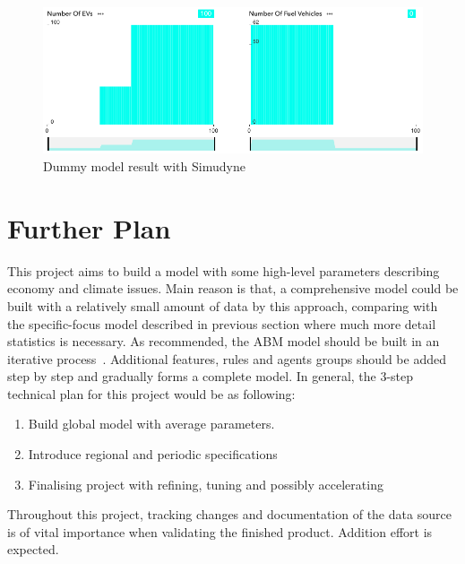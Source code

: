 \documentclass[12pt,twoside]{report}
\begin{document}
	\begin{figure}[h]
		\centering
		\includegraphics[width = 1\linewidth]{./figures/dummy}
		\caption{Dummy model result with Simudyne}
		\label{fig:dummy}
	\end{figure}


	
	
	\chapter{Further Plan}\label{ch:further-plan}
	This project aims to build a model with some high-level parameters describing economy and climate issues.
	Main reason is that, a comprehensive model could be built with a relatively small amount of data by this
	approach, comparing with the specific-focus model described in previous section where much more detail statistics
	is necessary.
	As recommended, the ABM model should be built in an iterative process~\cite{macal2014introductory}.
	Additional features, rules and agents groups should be added step by step and gradually forms a complete model.
	In general, the 3-step technical plan for this project would be as following:
	\begin{enumerate}
		\item Build global model with average parameters.
		\item Introduce regional and periodic specifications
		\item Finalising project with refining, tuning and possibly accelerating
	\end{enumerate}
	Throughout this project, tracking changes and documentation of the data source is of vital importance when
	validating the finished product.
	Addition effort is expected.


	
	


	
	
\end{document}
